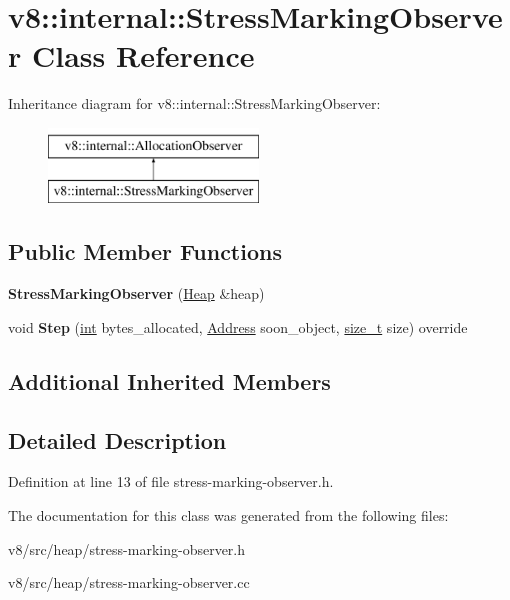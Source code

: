 \hypertarget{classv8_1_1internal_1_1StressMarkingObserver}{}\section{v8\+:\+:internal\+:\+:Stress\+Marking\+Observer Class Reference}
\label{classv8_1_1internal_1_1StressMarkingObserver}
Inheritance diagram for v8\+:\+:internal\+:\+:Stress\+Marking\+Observer\+:\begin{figure}[H]
\begin{center}
\leavevmode
\includegraphics[height=2.000000cm]{classv8_1_1internal_1_1StressMarkingObserver}
\end{center}
\end{figure}
\subsection*{Public Member Functions}
\begin{DoxyCompactItemize}
\item 
\mbox{\label{classv8_1_1internal_1_1StressMarkingObserver_a68b4c9f7002e6b151a313a0003a869f1}} 
{\bfseries Stress\+Marking\+Observer} (\mbox{\hyperlink{classv8_1_1internal_1_1Heap}{Heap}} \&heap)
\item 
\mbox{\label{classv8_1_1internal_1_1StressMarkingObserver_a6b08c1876bcecd2aeab45f7b2e093ebb}} 
void {\bfseries Step} (\mbox{\hyperlink{classint}{int}} bytes\+\_\+allocated, \mbox{\hyperlink{classuintptr__t}{Address}} soon\+\_\+object, \mbox{\hyperlink{classsize__t}{size\+\_\+t}} size) override
\end{DoxyCompactItemize}
\subsection*{Additional Inherited Members}


\subsection{Detailed Description}


Definition at line 13 of file stress-\/marking-\/observer.\+h.



The documentation for this class was generated from the following files\+:\begin{DoxyCompactItemize}
\item 
v8/src/heap/stress-\/marking-\/observer.\+h\item 
v8/src/heap/stress-\/marking-\/observer.\+cc\end{DoxyCompactItemize}

